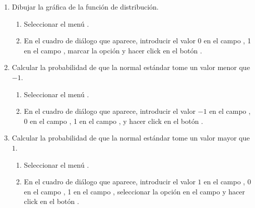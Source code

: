 \begin{enumerate}[leftmargin=*]
\begin{enumerate}
\item Dibujar la gráfica de la función de distribución. 
\begin{indicacion}{
\begin{enumerate}
\item Seleccionar el menú .
\item En el cuadro de diálogo que aparece, introducir el valor 0 en el campo , 1 en el campo
, marcar la opción  y hacer click en el botón .
\end{enumerate}}
\end{indicacion}

\item Calcular la probabilidad de que la normal estándar tome un valor menor que $-1$. 
\begin{indicacion}{
\begin{enumerate}
\item Seleccionar el menú .
\item En el cuadro de diálogo que aparece, introducir el valor $-1$ en el campo , 0 en el campo  
, 1 en el campo , y hacer click en el botón .
\end{enumerate}}
\end{indicacion}

\item Calcular la probabilidad de que la normal estándar tome un valor mayor que $1$. 
\begin{indicacion}{
\begin{enumerate}
\item Seleccionar el menú .
\item En el cuadro de diálogo que aparece, introducir el valor $1$ en el campo , 0 en el campo  
, 1 en el campo , seleccionar la opción  en el campo
 y hacer click en el botón .
\end{enumerate}}
\end{indicacion}


\end{enumerate}
\end{enumerate}
